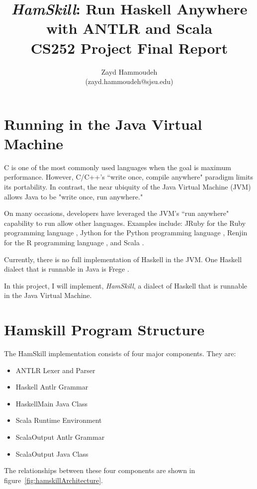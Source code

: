 \documentclass{report}
\title{\emph{HamSkill}: Run Haskell Anywhere \\
with ANTLR and Scala\\[1in]
	   CS252 Project Final Report}
\author{
  Zayd Hammoudeh \\
  (zayd.hammoudeh@sjsu.edu)
  }
\begin{document}
\maketitle

\tableofcontents

\renewcommand\thesection{\arabic{section}}
\section{Running in the Java Virtual Machine}

C is one of the most commonly used languages when the goal is maximum performance.  However, C/C++'s ``write once, compile anywhere" paradigm limits its portability.  In contrast, the near ubiquity of the Java Virtual Machine (JVM) allows Java to be "write once, run anywhere."  

On many occasions, developers have leveraged the JVM's ``run anywhere" capability to run allow other languages.  Examples include: JRuby for the Ruby programming language \cite{jruby}, Jython for the Python programming language \cite{jython_jvm}, Renjin for the R programming language \cite{renjin}, and Scala \cite{scala}.

Currently, there is no full implementation of Haskell in the JVM.  One Haskell dialect that is runnable in Java is Frege \cite{frege}.  

In this project, I will implement, \emph{HamSkill}, a dialect of Haskell that is runnable in the Java Virtual Machine.

\section{Hamskill Program Structure}

The HamSkill implementation consists of four major components.  They are:

\begin{itemize}
   \item ANTLR Lexer and Parser
   \item Haskell Antlr Grammar
   \item HaskellMain Java Class
   \item Scala Runtime Environment
   \item ScalaOutput Antlr Grammar
   \item ScalaOutput Java Class
\end{itemize}

The relationships between these four components are shown in figure~\ref{fig:hamskillArchitecture}.
\end{document}

